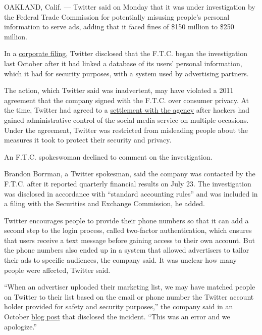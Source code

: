 OAKLAND, Calif. --- Twitter said on Monday that it was under
investigation by the Federal Trade Commission for potentially misusing
people's personal information to serve ads, adding that it faced fines
of \$150 million to \$250 million.

In a
\href{https://www.sec.gov/ix?doc=/Archives/edgar/data/1418091/000141809120000158/twtr-20200630.htm}{corporate
filing}, Twitter disclosed that the F.T.C. began the investigation last
October after it had linked a database of its users' personal
information, which it had for security purposes, with a system used by
advertising partners.

The action, which Twitter said was inadvertent, may have violated a 2011
agreement that the company signed with the F.T.C. over consumer privacy.
At the time, Twitter had agreed to a
\href{https://www.ftc.gov/news-events/press-releases/2011/03/ftc-accepts-final-settlement-twitter-failure-safeguard-personal-0}{settlement
with the agency} after hackers had gained administrative control of the
social media service on multiple occasions. Under the agreement, Twitter
was restricted from misleading people about the measures it took to
protect their security and privacy.

An F.T.C. spokeswoman declined to comment on the investigation.

Brandon Borrman, a Twitter spokesman, said the company was contacted by
the F.T.C. after it reported quarterly financial results on July 23. The
investigation was disclosed in accordance with ``standard accounting
rules'' and was included in a filing with the Securities and Exchange
Commission, he added.

Twitter encourages people to provide their phone numbers so that it can
add a second step to the login process, called two-factor
authentication, which ensures that users receive a text message before
gaining access to their own account. But the phone numbers also ended up
in a system that allowed advertisers to tailor their ads to specific
audiences, the company said. It was unclear how many people were
affected, Twitter said.

``When an advertiser uploaded their marketing list, we may have matched
people on Twitter to their list based on the email or phone number the
Twitter account holder provided for safety and security purposes,'' the
company said in an October
\href{https://help.twitter.com/en/information-and-ads}{blog post} that
disclosed the incident. ``This was an error and we apologize.''

